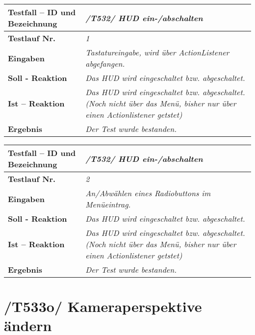 \begin{longtable}{|p{7cm}|p{10cm}|}
\hline
\textbf{Testfall -- ID und Bezeichnung} & \textit{/T532/ HUD ein-/abschalten} \\
\hline
\textbf{Testlauf Nr.} & \textit{1} \\
\hline
\textbf{Eingaben} & \textit{Tastatureingabe, wird über ActionListener abgefangen.} \\
\hline
\textbf{Soll - Reaktion} & \textit{Das HUD wird eingeschaltet bzw. abgeschaltet.} \\
\hline
\textbf{Ist -- Reaktion} & \textit{Das HUD wird eingeschaltet bzw. abgeschaltet.(Noch nicht über das Menü, bisher nur über einen Actionlistener getstet)} \\
\hline
\textbf{Ergebnis} & \textit{Der Test wurde bestanden.} \\
\hline
\end{longtable}

\begin{longtable}{|p{7cm}|p{10cm}|}
\hline
\textbf{Testfall -- ID und Bezeichnung} & \textit{/T532/ HUD ein-/abschalten} \\
\hline
\textbf{Testlauf Nr.} & \textit{2} \\
\hline
\textbf{Eingaben} & \textit{An/Abwählen eines Radiobuttons im Menüeintrag.} \\
\hline
\textbf{Soll - Reaktion} & \textit{Das HUD wird eingeschaltet bzw. abgeschaltet.} \\
\hline
\textbf{Ist -- Reaktion} & \textit{Das HUD wird eingeschaltet bzw. abgeschaltet.(Noch nicht über das Menü, bisher nur über einen Actionlistener getstet)} \\
\hline
\textbf{Ergebnis} & \textit{Der Test wurde bestanden.} \\
\hline
\end{longtable}

\section{/T533o/ Kameraperspektive ändern}

